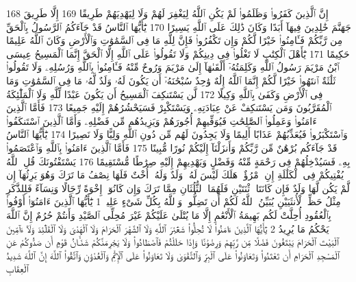 {\tiny\colorbox{cl_aya}{168}} إِنَّ ٱلَّذِينَ كَفَرُوا۟ وَظَلَمُوا۟ لَمْ يَكُنِ ٱللَّهُ لِيَغْفِرَ لَهُمْ وَلَا لِيَهْدِيَهُمْ طَرِيقًا
{\tiny\colorbox{cl_aya}{169}} إِلَّا طَرِيقَ جَهَنَّمَ خَٰلِدِينَ فِيهَآ أَبَدًا وَكَانَ ذَٰلِكَ عَلَى ٱللَّهِ يَسِيرًا
{\tiny\colorbox{cl_aya}{170}} يَٰٓأَيُّهَا ٱلنَّاسُ قَدْ جَآءَكُمُ ٱلرَّسُولُ بِٱلْحَقِّ مِن رَّبِّكُمْ فَـَٔامِنُوا۟ خَيْرًا لَّكُمْ وَإِن تَكْفُرُوا۟ فَإِنَّ لِلَّهِ مَا فِى ٱلسَّمَٰوَٰتِ وَٱلْأَرْضِ وَكَانَ ٱللَّهُ عَلِيمًا حَكِيمًا
{\tiny\colorbox{cl_aya}{171}} يَٰٓأَهْلَ ٱلْكِتَٰبِ لَا تَغْلُوا۟ فِى دِينِكُمْ وَلَا تَقُولُوا۟ عَلَى ٱللَّهِ إِلَّا ٱلْحَقَّ إِنَّمَا ٱلْمَسِيحُ عِيسَى ٱبْنُ مَرْيَمَ رَسُولُ ٱللَّهِ وَكَلِمَتُهُۥٓ أَلْقَىٰهَآ إِلَىٰ مَرْيَمَ وَرُوحٌ مِّنْهُ فَـَٔامِنُوا۟ بِٱللَّهِ وَرُسُلِهِۦ وَلَا تَقُولُوا۟ ثَلَٰثَةٌ ٱنتَهُوا۟ خَيْرًا لَّكُمْ إِنَّمَا ٱللَّهُ إِلَٰهٌ وَٰحِدٌ سُبْحَٰنَهُۥٓ أَن يَكُونَ لَهُۥ وَلَدٌ لَّهُۥ مَا فِى ٱلسَّمَٰوَٰتِ وَمَا فِى ٱلْأَرْضِ وَكَفَىٰ بِٱللَّهِ وَكِيلًا
{\tiny\colorbox{cl_aya}{172}} لَّن يَسْتَنكِفَ ٱلْمَسِيحُ أَن يَكُونَ عَبْدًا لِّلَّهِ وَلَا ٱلْمَلَٰٓئِكَةُ ٱلْمُقَرَّبُونَ وَمَن يَسْتَنكِفْ عَنْ عِبَادَتِهِۦ وَيَسْتَكْبِرْ فَسَيَحْشُرُهُمْ إِلَيْهِ جَمِيعًا
{\tiny\colorbox{cl_aya}{173}} فَأَمَّا ٱلَّذِينَ ءَامَنُوا۟ وَعَمِلُوا۟ ٱلصَّٰلِحَٰتِ فَيُوَفِّيهِمْ أُجُورَهُمْ وَيَزِيدُهُم مِّن فَضْلِهِۦ وَأَمَّا ٱلَّذِينَ ٱسْتَنكَفُوا۟ وَٱسْتَكْبَرُوا۟ فَيُعَذِّبُهُمْ عَذَابًا أَلِيمًا وَلَا يَجِدُونَ لَهُم مِّن دُونِ ٱللَّهِ وَلِيًّا وَلَا نَصِيرًا
{\tiny\colorbox{cl_aya}{174}} يَٰٓأَيُّهَا ٱلنَّاسُ قَدْ جَآءَكُم بُرْهَٰنٌ مِّن رَّبِّكُمْ وَأَنزَلْنَآ إِلَيْكُمْ نُورًا مُّبِينًا
{\tiny\colorbox{cl_aya}{175}} فَأَمَّا ٱلَّذِينَ ءَامَنُوا۟ بِٱللَّهِ وَٱعْتَصَمُوا۟ بِهِۦ فَسَيُدْخِلُهُمْ فِى رَحْمَةٍ مِّنْهُ وَفَضْلٍ وَيَهْدِيهِمْ إِلَيْهِ صِرَٰطًا مُّسْتَقِيمًا
{\tiny\colorbox{cl_aya}{176}} يَسْتَفْتُونَكَ قُلِ ٱللَّهُ يُفْتِيكُمْ فِى ٱلْكَلَٰلَةِ إِنِ ٱمْرُؤٌا۟ هَلَكَ لَيْسَ لَهُۥ وَلَدٌ وَلَهُۥٓ أُخْتٌ فَلَهَا نِصْفُ مَا تَرَكَ وَهُوَ يَرِثُهَآ إِن لَّمْ يَكُن لَّهَا وَلَدٌ فَإِن كَانَتَا ٱثْنَتَيْنِ فَلَهُمَا ٱلثُّلُثَانِ مِمَّا تَرَكَ وَإِن كَانُوٓا۟ إِخْوَةً رِّجَالًا وَنِسَآءً فَلِلذَّكَرِ مِثْلُ حَظِّ ٱلْأُنثَيَيْنِ يُبَيِّنُ ٱللَّهُ لَكُمْ أَن تَضِلُّوا۟ وَٱللَّهُ بِكُلِّ شَىْءٍ عَلِيمٌۢ
{\tiny\colorbox{cl_aya}{1}} يَٰٓأَيُّهَا ٱلَّذِينَ ءَامَنُوٓا۟ أَوْفُوا۟ بِٱلْعُقُودِ أُحِلَّتْ لَكُم بَهِيمَةُ ٱلْأَنْعَٰمِ إِلَّا مَا يُتْلَىٰ عَلَيْكُمْ غَيْرَ مُحِلِّى ٱلصَّيْدِ وَأَنتُمْ حُرُمٌ إِنَّ ٱللَّهَ يَحْكُمُ مَا يُرِيدُ
{\tiny\colorbox{cl_aya}{2}} يَٰٓأَيُّهَا ٱلَّذِينَ ءَامَنُوا۟ لَا تُحِلُّوا۟ شَعَٰٓئِرَ ٱللَّهِ وَلَا ٱلشَّهْرَ ٱلْحَرَامَ وَلَا ٱلْهَدْىَ وَلَا ٱلْقَلَٰٓئِدَ وَلَآ ءَآمِّينَ ٱلْبَيْتَ ٱلْحَرَامَ يَبْتَغُونَ فَضْلًا مِّن رَّبِّهِمْ وَرِضْوَٰنًا وَإِذَا حَلَلْتُمْ فَٱصْطَادُوا۟ وَلَا يَجْرِمَنَّكُمْ شَنَـَٔانُ قَوْمٍ أَن صَدُّوكُمْ عَنِ ٱلْمَسْجِدِ ٱلْحَرَامِ أَن تَعْتَدُوا۟ وَتَعَاوَنُوا۟ عَلَى ٱلْبِرِّ وَٱلتَّقْوَىٰ وَلَا تَعَاوَنُوا۟ عَلَى ٱلْإِثْمِ وَٱلْعُدْوَٰنِ وَٱتَّقُوا۟ ٱللَّهَ إِنَّ ٱللَّهَ شَدِيدُ ٱلْعِقَابِ
